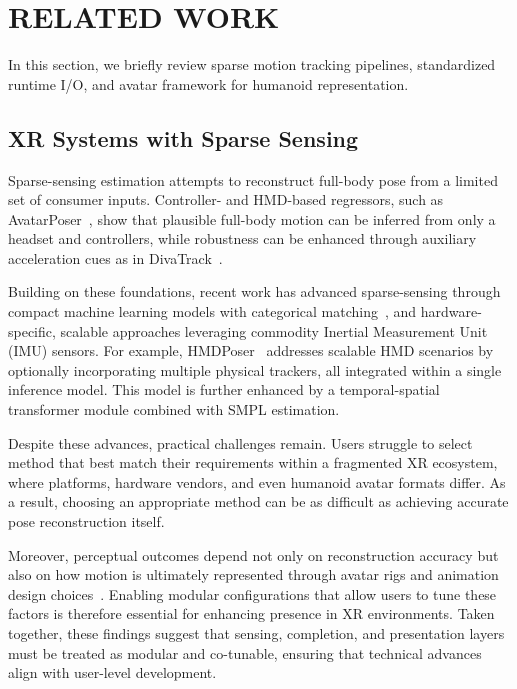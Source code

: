 \section{RELATED WORK}

In this section, we briefly review sparse motion tracking pipelines, standardized runtime I/O, and avatar framework for humanoid representation. 

\subsection*{XR Systems with Sparse Sensing}
Sparse-sensing estimation attempts to reconstruct full-body pose from a limited set of consumer inputs. Controller- and HMD-based regressors, such as AvatarPoser~\cite{jiang2022avatarposer}, show that plausible full-body motion can be inferred from only a headset and controllers, while robustness can be enhanced through auxiliary acceleration cues as in DivaTrack~\cite{yang2024divatrack}. 

Building on these foundations, recent work has advanced sparse-sensing through compact machine learning models with categorical matching~\cite{starke2024categorical}, and hardware-specific, scalable approaches leveraging commodity Inertial Measurement Unit (IMU) sensors.
For example, HMDPoser~\cite{dai2024hmd} addresses scalable HMD scenarios by optionally incorporating multiple physical trackers, all integrated within a single inference model.
This model is further enhanced by a temporal-spatial transformer module combined with SMPL estimation.

Despite these advances, practical challenges remain. 
Users struggle to select method that best match their requirements within a fragmented XR ecosystem, where platforms, hardware vendors, and even humanoid avatar formats differ.
As a result, choosing an appropriate method can be as difficult as achieving accurate pose reconstruction itself.

Moreover, perceptual outcomes depend not only on reconstruction accuracy but also on how motion is ultimately represented through avatar rigs and animation design choices~\cite{yun2023animationfidelity}. 
Enabling modular configurations that allow users to tune these factors is therefore essential for enhancing presence in XR environments.
Taken together, these findings suggest that sensing, completion, and presentation layers must be treated as modular and co-tunable, ensuring that technical advances align with user-level development.

